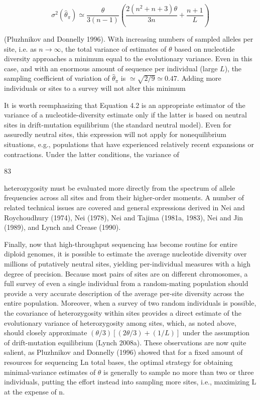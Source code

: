 \documentclass{article}
\begin{document}
\begin{equation}
\sigma^{2}(\widehat{\theta}_{\pi})\simeq\frac{\theta}{3(n-1)}\left(\frac{2(n^{2}+n+3)\theta}{3n}+\frac{n+1}{L}\right)
\tag{4.2}
\label{eq:4_2}
\end{equation}

(Pluzhnikov and Donnelly 1996). With increasing numbers of sampled alleles per site, i.e. as $n \to \infty$, the total variance of estimates of $\theta$ based on nucleotide diversity approaches a minimum equal to the evolutionary variance. Even in this case, and with an enormous amount of sequence per individual (large $L$), the sampling coefficient of variation of $\widehat{\theta}_{\pi}$ is $\simeq \sqrt{2/9} \simeq 0.47$. Adding more individuals or sites to a survey will not alter this minimum

It is worth reemphasizing that Equation 4.2 is an appropriate estimator of the variance of a nucleotide-diversity estimate only if the latter is based on neutral sites in drift-mutation equilibrium (the standard neutral model). Even for assuredly neutral sites, this expression will not apply for nonequilibrium situations, e.g., populations that have experienced relatively recent expansions or contractions. Under the latter conditions, the variance of

83

heterozygosity must be evaluated more directly from the spectrum of allele frequencies across all sites and from their higher-order moments. A number of related technical issues are covered and general expressions derived in Nei and Roychoudhury (1974), Nei (1978), Nei and Tajima (1981a, 1983), Nei and Jin (1989), and Lynch and Crease (1990).

Finally, now that high-throughput sequencing has become routine for entire diploid genomes, it is possible to estimate the average nucleotide diversity over millions of putatively neutral sites, yielding per-individual measures with a high degree of precision. Because most pairs of sites are on different chromosomes, a full survey of even a single individual from a random-mating population should provide a very accurate description of the average per-site diversity across the entire population. Moreover, when a survey of two random individuals is possible, the covariance of heterozygosity within sites provides a direct estimate of the evolutionary variance of heterozygosity among sites, which, as noted above, should closely approximate  $ (\theta/3)[(2\theta/3)+(1/L)] $ under the assumption of drift-mutation equilibrium (Lynch 2008a). These observations are now quite salient, as Pluzhnikov and Donnelly (1996) showed that for a fixed amount of resources for sequencing Ln total bases, the optimal strategy for obtaining minimal-variance estimates of  $ \theta $ is generally to sample no more than two or three individuals, putting the effort instead into sampling more sites, i.e., maximizing L at the expense of n.
\end{document}
